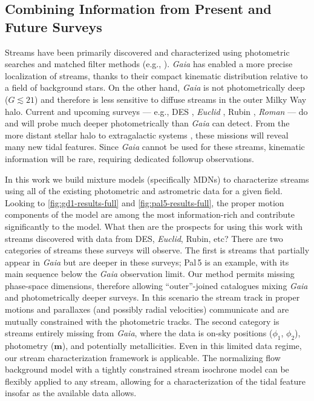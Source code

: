 \documentclass[twocolumn, linenumbers]{aastex631}
\newcommand{\stream}[1]{#1}
\newcommand{\dataarchive}[1]{\textit{#1}}
\newcommand{\Gaia}{\dataarchive{Gaia}}
\newcommand{\mbs}[1]{\boldsymbol{#1}}
\begin{document}

    \subsection{Combining Information from Present and Future Surveys} \label{sub:future_surveys}

        Streams have been primarily discovered and characterized using
        photometric searches and matched filter methods (e.g.,
        \citealt{Rockosi+2002, Grillmair2014, Bonaca+2012, Jethwa+2018,
        Shipp+2018}).  \Gaia{} has enabled a more precise localization of
        streams, thanks to their  compact kinematic distribution relative to a
        field of background stars.  On the other hand, \Gaia{} is not
        photometrically deep ($G\lesssim 21$) and therefore is less sensitive to
        diffuse streams in the outer Milky Way halo.  Current and upcoming
        surveys --- e.g., DES \citep{Abbott+2018, Abbott+2021}, \textit{Euclid}
        \citep{Laureijs+2011}, Rubin \citep{Ivezic+2019}, \textit{Roman}
        \citep{Spergel+2013} --- do and will probe much deeper photometrically
        than \Gaia{} can detect.  From the more distant stellar halo
        \citep{Shipp+2018} to extragalactic systems
        \citep{Martinez-Delgado+2008, Demirjian+2020, Roman+2023}, these
        missions will reveal many new tidal features. Since \Gaia{} cannot be
        used for these streams, kinematic information will be rare, requiring
        dedicated followup observations.

        
        In this work we build mixture models (specifically MDNs) to characterize
        streams using all of the existing photometric and astrometric data for a
        given field. Looking to \autoref{fig:gd1-results-full} and
        \autoref{fig:pal5-results-full}, the proper motion components of the
        model are among the most information-rich and contribute significantly
        to the model. What then are the prospects for using this work with
        streams discovered with data from DES, \textit{Euclid}, Rubin, etc?
        There are two categories of streams these surveys will observe. The
        first is streams that partially appear in \Gaia{} but are deeper in
        these surveys; \stream{Pal\,5} is an example, with its main sequence
        below the \Gaia{} observation limit. Our method permits missing
        phase-space dimensions, therefore allowing ``outer''-joined catalogues
        mixing \Gaia{} and photometrically deeper surveys. In this scenario the
        stream track in proper motions and parallaxes (and possibly radial
        velocities) communicate and are mutually constrained with the
        photometric tracks. The second category is streams entirely missing from
        \Gaia{}, where the data is on-sky positions ($\phi_1$, $\phi_2$),
        photometry ($\mbs{m}$), and potentially metallicities. Even in this
        limited data regime,  our stream characterization framework is
        applicable. The  normalizing flow background model with a tightly
        constrained stream isochrone model can be flexibly applied to any
        stream, allowing for a characterization of the tidal feature insofar as
        the available data allows.  
        
\end{document}
